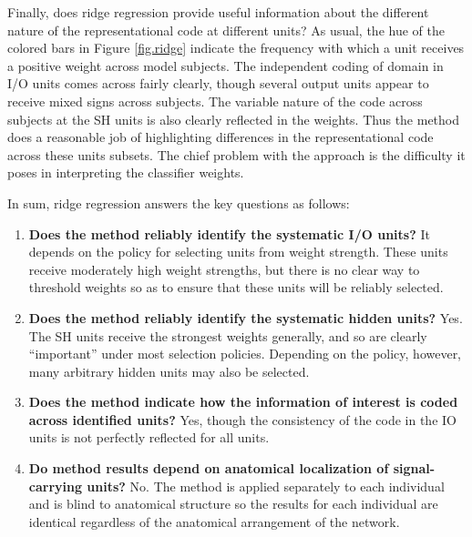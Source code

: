 Finally, does ridge regression provide useful information about the different nature of the representational code at different units? As usual, the hue of the colored bars in Figure \ref{fig.ridge} indicate the frequency with which a unit receives a positive weight across model subjects. The independent coding of domain in I/O units comes across fairly clearly, though several output units appear to receive mixed signs across subjects. The variable nature of the code across subjects at the SH units is also clearly reflected in the weights. Thus the method does a reasonable job of highlighting differences in the representational code across these units subsets. The chief problem with the approach is the difficulty it poses in interpreting the classifier weights.

In sum, ridge regression answers the key questions as follows:

\begin{enumerate}
\item {\bf Does the method reliably identify the systematic I/O units?} It depends on the policy for selecting units from weight strength. These units receive moderately high weight strengths, but there is no clear way to threshold weights so as to ensure that these units will be reliably selected.
\item {\bf Does the method reliably identify the systematic hidden units?} Yes. The SH units receive the strongest weights generally, and so are clearly ``important'' under most selection policies. Depending on the policy, however, many arbitrary hidden units may also be selected.
\item {\bf Does the method indicate how the information of interest is coded across identified units?} Yes, though the consistency of the code in the IO units is not perfectly reflected for all units.
\item {\bf Do method results depend on anatomical localization of signal-carrying units?} No. The method is applied separately to each individual and is blind to anatomical structure so the results for each individual are identical regardless of the anatomical arrangement of the network.
\end{enumerate}

